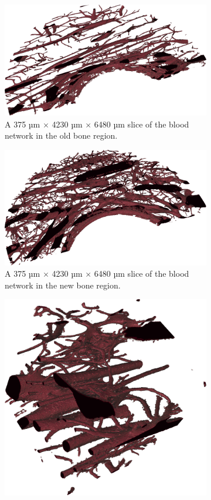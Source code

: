 \begin{figure}
    \centering
    \begin{subfigure}[b]{\linewidth}
    \centering
        \includegraphics[width=.7\linewidth]{generated/figure10_old_bone.png}
        \caption{A 375 µm $\times$ 4230 µm $\times$ 6480 µm slice of the blood network in the old bone region.}
        \label{fig:blood-old-slice}
    \end{subfigure}
    \begin{subfigure}[b]{\linewidth}
    \centering
        \includegraphics[width=.7\linewidth]{generated/figure10_new_bone.png}
        \caption{A 375 µm $\times$ 4230 µm $\times$ 6480 µm slice of the blood network in the new bone region.}
        \label{fig:blood-new-slice}
    \end{subfigure}
    \begin{subfigure}[b]{.48\linewidth}
    \centering
        \includegraphics[width=.9\linewidth,height=\linewidth]{generated/figure10_old_cube.png}

\end{subfigure}
\end{figure}
